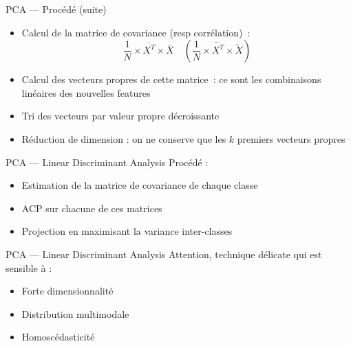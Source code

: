 \begin{frame}{PCA --- Procédé (suite)}
  \begin{itemize}[<+->]
    \item Calcul de la matrice de covariance (resp corrélation)~:
      \[
      \frac{1}{N} \times \overline{X^T} \times \overline{X}
      \quad
      ( \frac{1}{N} \times \widetilde{X^T} \times \widetilde{X} )
      \]
    \item Calcul des vecteurs propres de cette matrice~: ce sont les combinaisons linéaires des nouvelles features
    \item Tri des vecteurs par valeur propre décroissante
    \item Réduction de dimension : on ne conserve que les $k$ premiers vecteurs propres
  \end{itemize}
\end{frame}

\begin{frame}{PCA --- Linear Discriminant Analysis}
  Procédé : \\
  \begin{itemize}
    \item Estimation de la matrice de covariance de chaque classe
    \item ACP sur chacune de ces matrices
    \item Projection en maximisant la variance inter-classes
  \end{itemize}
\end{frame}

\begin{frame}{PCA --- Linear Discriminant Analysis}
  Attention, technique délicate qui est sensible à : \\
  \begin{itemize}
    \item Forte dimensionnalité
    \item Distribution multimodale
    \item Homoscédasticité
  \end{itemize}
\end{frame}
